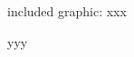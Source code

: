 \documentclass{article}
\begin{document}
\raggedright
%
%
%

included graphic:
xxx

yyy

\end{document}
